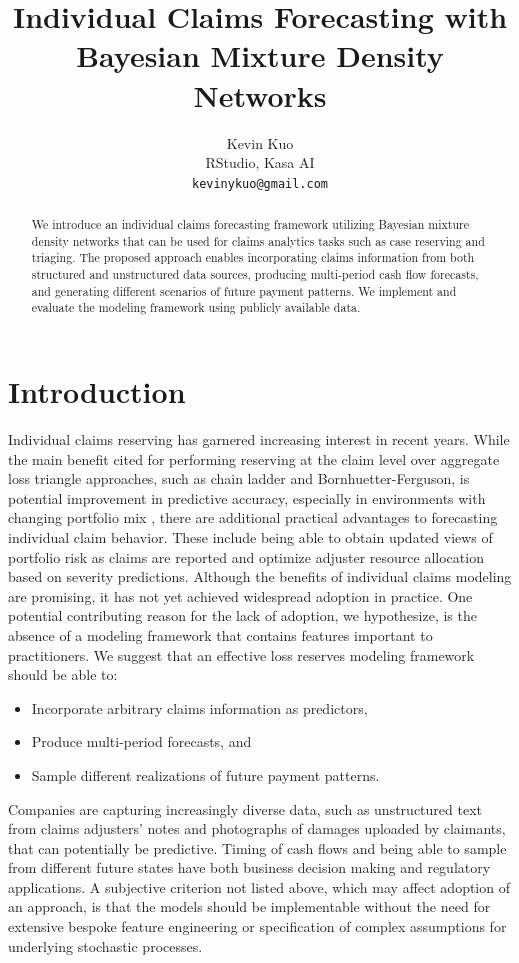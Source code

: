 \documentclass{article}
\title{Individual Claims Forecasting with Bayesian Mixture Density Networks}
\author{
  Kevin Kuo \\
  RStudio, Kasa AI\\
  \texttt{kevinykuo@gmail.com} \\
}
\begin{document}
\maketitle

\begin{abstract}
We introduce an individual claims forecasting framework utilizing Bayesian mixture density networks that can be used for claims analytics tasks such as case reserving and triaging. The proposed approach enables incorporating claims information from both structured and unstructured data sources, producing multi-period cash flow forecasts, and generating different scenarios of future payment patterns. We implement and evaluate the modeling framework using publicly available data.
\end{abstract}



\section{Introduction}

Individual claims reserving has garnered increasing interest in recent years. While the main benefit cited for performing reserving at the claim level over aggregate loss triangle approaches, such as chain ladder and Bornhuetter-Ferguson, is potential improvement in predictive accuracy, especially in environments with changing portfolio mix \cite{boumezoued2017individual}, there are additional practical advantages to forecasting individual claim behavior. These include being able to obtain updated views of portfolio risk as claims are reported and optimize adjuster resource allocation based on severity predictions. Although the benefits of individual claims modeling are promising, it has not yet achieved widespread adoption in practice. One potential contributing reason for the lack of adoption, we hypothesize, is the absence of a modeling framework that contains features important to practitioners. We suggest that an effective loss reserves modeling framework should be able to:

\begin{itemize}
	\item Incorporate arbitrary claims information as predictors,
	\item Produce multi-period forecasts, and
	\item Sample different realizations of future payment patterns.
\end{itemize}
Companies are capturing increasingly diverse data, such as unstructured text from claims adjusters' notes and photographs of damages uploaded by claimants, that can potentially be predictive. Timing of cash flows and being able to sample from different future states have both business decision making and regulatory applications. A subjective criterion not listed above, which may affect adoption of an approach, is that the models should be implementable without the need for extensive bespoke feature engineering or specification of complex assumptions for underlying stochastic processes.
\end{document}
